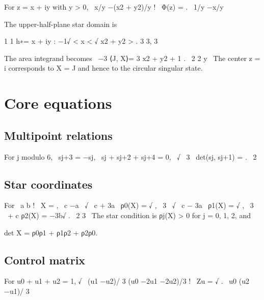 \begin{displaytext}
For z = x + iy with y > 0, \
x/y −(x2 + y2)/y ! \
Φ(z) = . \
1/y −x/y
\end{displaytext}

The upper-half-plane star domain is


\begin{displaytext}
1 1 h∗= x + iy : −1√ < x < √ x2 + y2 > . 3 3, 3
\end{displaytext}

\begin{displaytext}
The area integrand becomes \
−3 ⟨J, X⟩= 3 x2 + y2 + 1 . \
2 2 y \
The center z = i corresponds to X = J and hence to the circular singular state.
\end{displaytext}

\section{Core equations}

\subsection{Multipoint relations}

\begin{displaytext}
For j modulo 6, \
sj+3 = −sj, \
sj + sj+2 + sj+4 = 0, \
√ \
3 \
det(sj, sj+1) = . \
2
\end{displaytext}

\subsection{Star coordinates}

\begin{displaytext}
For \
a b ! \
X = , \
c −a \
√ \
c + 3a \
ρ0(X) = √ , \
3 \
√ \
c − 3a \
ρ1(X) = √ , \
3 \
+ c ρ2(X) = −3b√ . \
2 3 \
The star condition is ρj(X) > 0 for j = 0, 1, 2, and
\end{displaytext}

\begin{displaytext}
det X = ρ0ρ1 + ρ1ρ2 + ρ2ρ0.
\end{displaytext}

\subsection{Control matrix}

\begin{displaytext}
For u0 + u1 + u2 = 1, √ \
(u1 −u2)/ 3 (u0 −2u1 −2u2)/3 ! \
Zu = √ . \
u0 (u2 −u1)/ 3
\end{displaytext}

